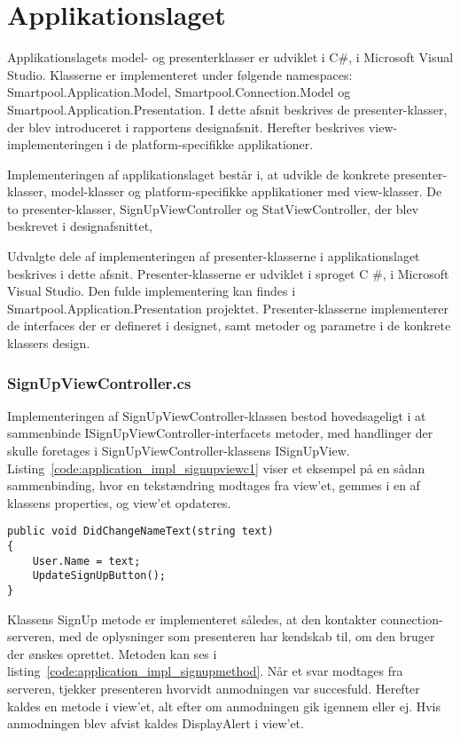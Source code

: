 \section{Applikationslaget}
Applikationslagets model- og presenterklasser er udviklet i C\#, i Microsoft Visual Studio. Klasserne er implementeret under følgende namespaces: Smartpool.Application.Model, Smartpool.Connection.Model og Smartpool.Application.Presentation. I dette afsnit beskrives de presenter-klasser, der blev introduceret i rapportens designafsnit. Herefter beskrives view-implementeringen i de platform-specifikke applikationer.

Implementeringen af applikationslaget består i, at udvikle de konkrete presenter-klasser, model-klasser og platform-specifikke applikationer med view-klasser. De to presenter-klasser, SignUpViewController og StatViewController, der blev beskrevet i designafsnittet, 

Udvalgte dele af implementeringen af presenter-klasserne i applikationslaget beskrives i dette afsnit. Presenter-klasserne er udviklet i sproget C \#, i Microsoft Visual Studio. Den fulde implementering kan findes i Smartpool.Application.Presentation projektet. Presenter-klasserne implementerer de interfaces der er defineret i designet, samt metoder og parametre i de konkrete klassers design.

\subsubsection{SignUpViewController.cs}
Implementeringen af SignUpViewController-klassen bestod hovedsageligt i at sammenbinde ISignUpViewController-interfacets metoder, med handlinger der skulle foretages i SignUpViewController-klassens ISignUpView. Listing~\ref{code:application_impl_signupviewc1} viser et eksempel på en sådan sammenbinding, hvor en tekstændring modtages fra view'et, gemmes i en af klassens properties, og view'et opdateres.

\begin{lstlisting}[caption={DidChangeNameText(...)},label={code:application_impl_signupviewc1}]
public void DidChangeNameText(string text)
{
	User.Name = text;
	UpdateSignUpButton();
}
\end{lstlisting}

Klassens SignUp metode er implementeret således, at den kontakter connection-serveren, med de oplysninger som presenteren har kendskab til, om den bruger der ønskes oprettet. Metoden kan ses i listing~\ref{code:application_impl_signupmethod}. Når et svar modtages fra serveren, tjekker presenteren hvorvidt anmodningen var succesfuld. Herefter kaldes en metode i view'et, alt efter om anmodningen gik igennem eller ej. Hvis anmodningen blev afvist kaldes DisplayAlert i view'et.

